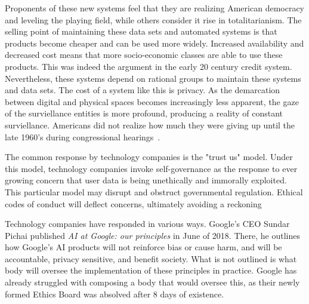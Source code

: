 Proponents of these new systems feel that they are realizing American democracy
and leveling the playing field, while others consider it rise in
totalitarianism. The selling point of maintaining these data sets and
automated systems is that products become cheaper and can be used more widely.
Increased availability and decreased cost means that more socio-economic
classes are able to use these products. This was indeed the argument in the
early 20 century credit system. Nevertheless, these systems depend on
rational groups to maintain these systems and data sets. The cost of a system
like this is privacy. As the demarcation between digital and physical spaces
becomes increasingly less apparent, the gaze of the surviellance entities is
more profound, producing a reality of constant surviellance. Americans did not
realize how much they were giving up until the late 1960's during congressional
hearings~\cite{lauer2017creditworthy}.


The common response by technology companies is the "trust us" model. Under this
model, technology companies invoke self-governance as the response to ever
growing concern that user data is being unethically and immorally exploited.
This particular model may disrupt and obstruct governmental regulation. Ethical
codes of conduct will deflect concerns, ultimately avoiding a reckoning~\cite{whittaker2018ai}

Technology companies have responded in various ways. Google's CEO Sundar Pichai
published \textit{AI at Google: our principles} in June of 2018. There, he
outlines how Google's AI products will not reinforce bias or cause harm, and
will be accountable, privacy sensitive, and benefit society. What is not
outlined is what body will oversee the implementation of these principles in
practice. Google has already struggled with composing a body that would oversee
this, as their newly formed Ethics Board was absolved after 8 days of existence.



